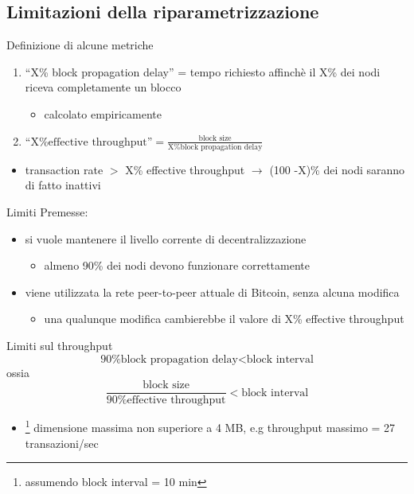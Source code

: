 \documentclass{beamer}
\begin{document}
  \subsection{Limitazioni della riparametrizzazione}
  \begin{frame}{Definizione di alcune metriche}
      \begin{enumerate}
          \item ``X\% block propagation delay'' = tempo richiesto affinchè il X\% dei nodi riceva completamente un blocco
          \begin{itemize}
              \item[\MVRightarrow] calcolato empiricamente
          \end{itemize}
          \item $\text{``X\% effective throughput''} = \frac{\text{block size}}{\text{X\% block propagation delay}}$
      \end{enumerate}
      \begin{itemize}
          \item transaction rate $>$ X\% effective throughput $\rightarrow$ (100 -X)\% dei nodi saranno di fatto inattivi
      \end{itemize}
  \end{frame} 
  
  
  \begin{frame}{Limiti}
    Premesse:
    \begin{itemize}
        \item si vuole mantenere il livello corrente di decentralizzazione 
        \begin{itemize}
            \item[\MVRightarrow] almeno 90\% dei nodi devono funzionare correttamente
        \end{itemize}
        \item viene utilizzata la rete peer-to-peer attuale di Bitcoin, senza alcuna modifica
        \begin{itemize}
            \item[\MVRightarrow] una qualunque modifica cambierebbe il valore di X\% effective throughput
        \end{itemize}
    \end{itemize}
    
    \begin{block}{Limiti sul throughput}
        \[ \text{90\% block propagation delay} < \text{block interval} \]
        ossia 
        \[ \frac{\text{block size}}{\text{90\% effective throughput}} < \text{block interval} \]
        \begin{itemize}
            \item[\MVRightarrow] \footnote{assumendo block interval = 10 min} dimensione massima non superiore a 4 MB, e.g throughput massimo = 27 transazioni/sec 
        \end{itemize}
    \end{block}
  \end{frame}
  
\end{document}
